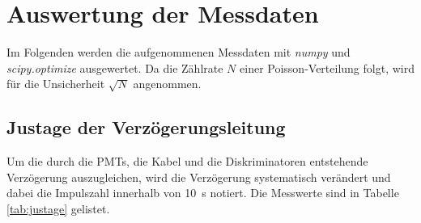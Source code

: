 \section{Auswertung der Messdaten}
\label{sec:Auswertung}
Im Folgenden werden die aufgenommenen Messdaten mit \textit{numpy} und \textit{scipy.optimize} ausgewertet. Da die Zählrate $N$ einer Poisson-Verteilung folgt, wird
für die Unsicherheit $\sqrt{N}$ angenommen. 

\subsection{Justage der Verzögerungsleitung}
\label{sec:justage}
Um die durch die PMTs, die Kabel und die Diskriminatoren entstehende Verzögerung auszugleichen, wird die Verzögerung systematisch verändert und dabei die Impulszahl innerhalb von \SI{10}{\second} 
notiert. Die Messwerte sind in Tabelle \ref{tab:justage} gelistet. 
